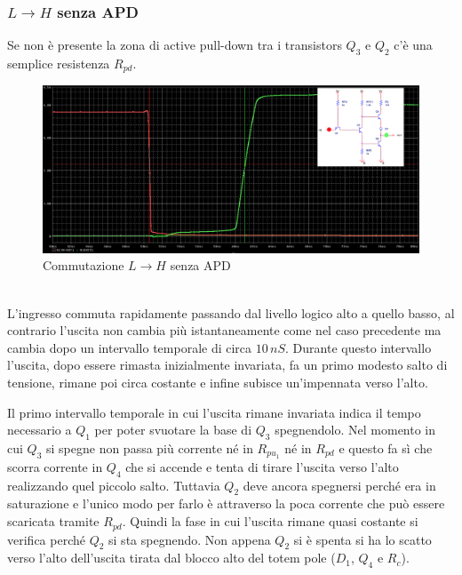 \documentclass[12pt, a4paper]{report}
\begin{document}
\subsubsection{$L \rightarrow H$ senza APD}
Se non è presente la zona di active pull-down tra i transistors $Q_3$ e $Q_2$ c'è una semplice resistenza $R_{pd}$.
\begin{figure}[h]
    \centering
    \includegraphics[scale=0.35,angle=0]{ttl_l_to_h_noapd1.png}
    \caption{Commutazione $L \rightarrow H$ senza APD}
\end{figure}
\\L'ingresso commuta rapidamente passando dal livello logico alto a quello basso, al contrario l'uscita non cambia più istantaneamente come nel caso precedente ma cambia dopo un intervallo temporale di circa $10\,nS$. Durante questo intervallo l'uscita, dopo essere rimasta inizialmente invariata, fa un primo modesto salto di tensione, rimane poi circa costante e infine subisce un'impennata verso l'alto.

Il primo intervallo temporale in cui l'uscita rimane invariata indica il tempo necessario a $Q_1$ per poter svuotare la base di $Q_3$ spegnendolo. Nel momento in cui $Q_3$ si spegne non passa più corrente né in $R_{pu_{1}}$ né in $R_{pd}$ e questo fa sì che scorra corrente in $Q_4$ che si accende e tenta di tirare l'uscita verso l'alto realizzando quel piccolo salto. Tuttavia $Q_2$ deve ancora spegnersi perché era in saturazione e l'unico modo per farlo è attraverso la poca corrente che può essere scaricata tramite $R_{pd}$. Quindi la fase in cui l'uscita rimane quasi costante si verifica perché $Q_2$ si sta spegnendo. Non appena $Q_2$ si è spenta si ha lo scatto verso l'alto dell'uscita tirata dal blocco alto del totem pole ($D_1$, $Q_4$ e $R_c$).
\end{document}
